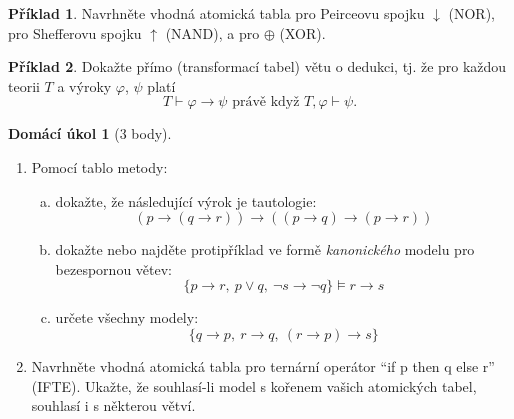 \documentclass[a4paper]{article}
\theoremstyle{definition}
\newtheorem{problem}{Příklad}
\newtheorem*{ukol}{Domácí úkol}
\begin{document}
\medskip\begin{problem} 
    Navrhněte vhodná atomická tabla pro Peirceovu spojku $\downarrow$ (NOR), pro Shefferovu spojku $\uparrow$ (NAND), a pro $\oplus$ (XOR).
\end{problem}


\medskip\begin{problem}
Dokažte přímo (transformací tabel) větu o dedukci, tj. že pro každou teorii $T$ a výroky $\varphi$, $\psi$ platí
$$T \vdash \varphi\to \psi\text{\ \ právě když\ \ }T,\varphi \vdash \psi.$$
\end{problem}\medskip


\medskip\begin{ukol}[3 body]
\begin{enumerate}[1.]
\item Pomocí tablo metody:
\begin{enumerate}[(a)]
    \item dokažte, že následující výrok je tautologie: 
    $$(p \to (q \to r)) \to ((p\to q)\to (p \to r))$$
    \item dokažte nebo najděte protipříklad ve formě \emph{kanonického} modelu pro bezespornou větev:
    $$\{ p \to r,\ p \vee q,\ \neg s \to \neg q\} \models r \to s$$
    \item určete všechny modely:
    $$\{ q \to p,\ r \to q,\ (r \to p) \to s\}$$
\end{enumerate}
\item Navrhněte vhodná atomická tabla pro ternární operátor ``if p then q else r'' (IFTE). Ukažte, že souhlasí-li model s kořenem vašich atomických tabel, souhlasí i s některou větví.
\end{enumerate} 
\end{ukol}
\end{document}
